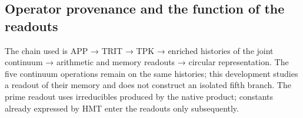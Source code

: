 \subsection{Operator provenance and the function of the readouts}
\label{tm-add-m1}

% 
% 
% 
The chain used is APP → TRIT → TPK → enriched histories of the joint continuum → arithmetic and memory readouts → circular representation. The five continuum operations remain on the same histories; this development studies a readout of their memory and does not construct an isolated fifth branch. The prime readout uses irreducibles produced by the native product; constants already expressed by HMT enter the readouts only subsequently.


